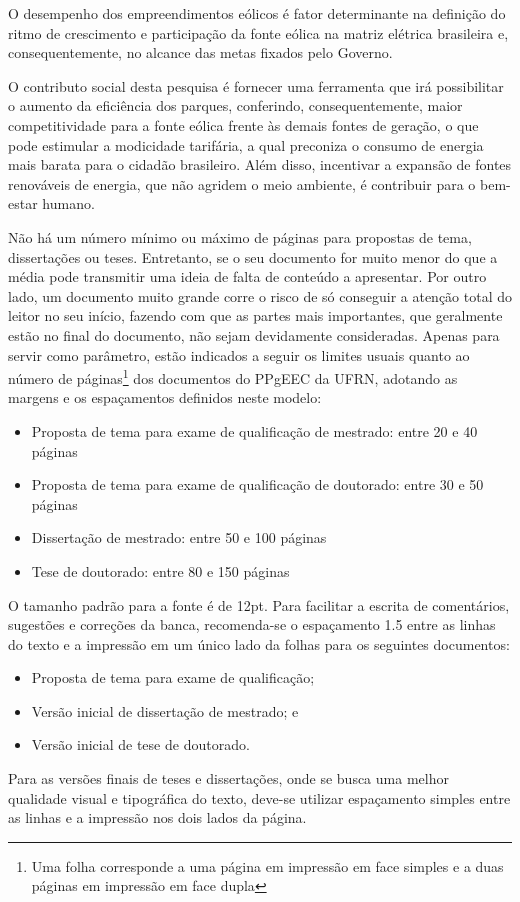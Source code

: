 O desempenho dos empreendimentos eólicos é fator determinante na definição do ritmo de crescimento e participação da fonte eólica na matriz elétrica brasileira e, consequentemente, no alcance das metas fixados pelo Governo.

O contributo social desta pesquisa é fornecer uma ferramenta que irá possibilitar o aumento da eficiência dos parques, conferindo, consequentemente, maior competitividade para a fonte eólica frente às demais fontes de geração, o que pode estimular a modicidade tarifária, a qual preconiza o consumo de energia mais barata para o cidadão brasileiro. Além disso, incentivar a expansão de fontes renováveis de energia, que não agridem o meio ambiente, é contribuir para o bem-estar humano.






Não há um número mínimo ou máximo de páginas para propostas de tema,
dissertações ou teses. Entretanto, se o seu documento for muito menor
do que a média pode transmitir uma ideia de falta de conteúdo a
apresentar. Por outro lado, um documento muito grande corre o risco de
só conseguir a atenção total do leitor no seu início, fazendo com que
as partes mais importantes, que geralmente estão no final do
documento, não sejam devidamente consideradas. Apenas para servir como
parâmetro, estão indicados a seguir os limites usuais quanto ao número
de páginas\footnote{Uma folha corresponde a uma página em impressão em
face simples e a duas páginas em impressão em face dupla} dos
documentos do PPgEEC da UFRN, adotando as margens e os espaçamentos
definidos neste modelo:
\begin{itemize}
\item Proposta de tema para exame de qualificação de mestrado:
entre 20 e 40 páginas
\item Proposta de tema para exame de qualificação de doutorado:
entre 30 e 50 páginas
\item Dissertação de mestrado:
entre 50 e 100 páginas
\item Tese de doutorado:
entre 80 e 150 páginas
\end{itemize}

O tamanho padrão para a fonte é de 12pt.  Para facilitar a escrita de
comentários, sugestões e correções da banca, recomenda-se o espaçamento
1.5 entre as linhas do texto e a impressão em um único lado da folhas
para os seguintes documentos:
\begin{itemize}
\item Proposta de tema para exame de qualificação;
\item Versão inicial de dissertação de mestrado; e
\item Versão inicial de tese de doutorado.
\end{itemize}
Para as versões finais de teses e dissertações, onde se busca uma
melhor qualidade visual e tipográfica do texto, deve-se utilizar
espaçamento simples entre as linhas e a impressão nos dois lados da
página.

